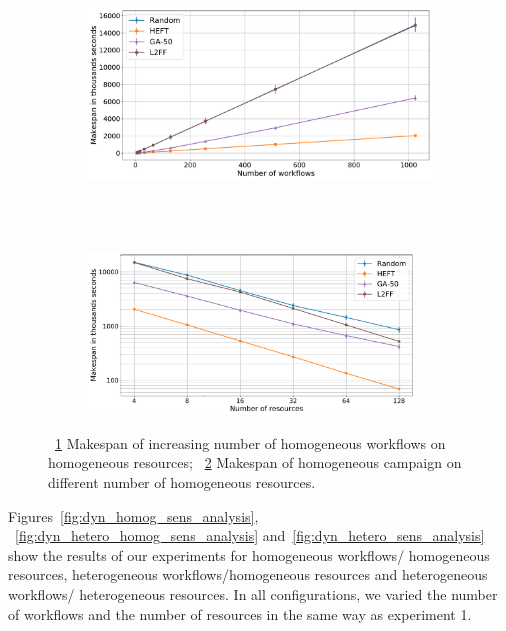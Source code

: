 \begin{figure}[ht!]
    \centering
    \begin{subfigure}[b]{0.75\textwidth}
        \includegraphics[width=.95\textwidth]{figures/campaign/StHeteroCampaigns_4DynHeteroResources.pdf}
        \caption{}
        \label{fig:StHeteroCampaigns_4DyHeteroResources}
    \end{subfigure}\\
    ~ 
    \begin{subfigure}[b]{0.75\textwidth}
        \includegraphics[width=0.95\textwidth]{figures/campaign/DynHeteroResources_StHeteroCampaigns.pdf}
        \caption{}
        \label{fig:DyHeteroResources_StHeteroCampaigns}
    \end{subfigure}
    \caption{~\ref{fig:StHeteroCampaigns_4DyHeteroResources} Makespan of increasing number of homogeneous workflows on homogeneous resources;
        ~\ref{fig:DyHeteroResources_StHeteroCampaigns} Makespan of homogeneous campaign on different number of homogeneous resources.}
    \label{fig:dyn_hetero_analysis}
\end{figure}

Figures~\ref{fig:dyn_homog_sens_analysis}, ~\ref{fig:dyn_hetero_homog_sens_analysis} and~\ref{fig:dyn_hetero_sens_analysis} show the results of our experiments for homogeneous workflows/ homogeneous resources, heterogeneous workflows/homogeneous resources and heterogeneous workflows/ heterogeneous resources.
In all configurations, we varied the number of workflows and the number of resources in the same way as experiment 1.

